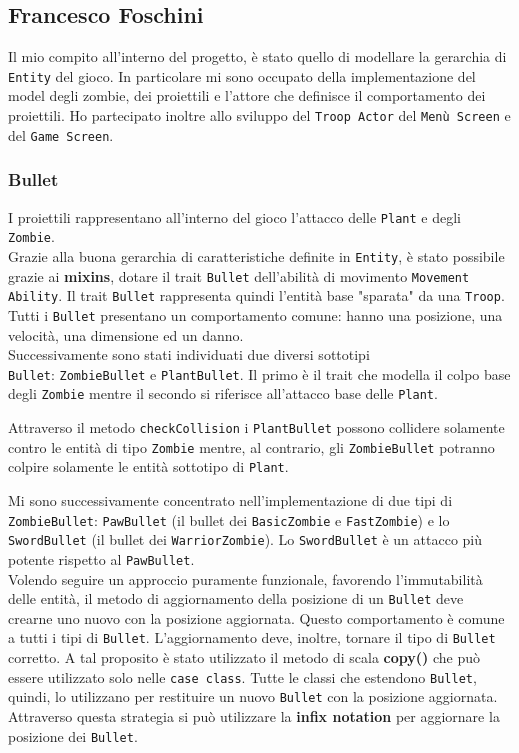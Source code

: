 \subsection{Francesco Foschini}
Il mio compito all'interno del progetto, è stato quello di modellare la gerarchia di \texttt{Entity} del gioco.
In particolare mi sono occupato della implementazione del model degli zombie, dei proiettili e l'attore che definisce il comportamento dei proiettili.
Ho partecipato inoltre allo sviluppo del \texttt{Troop Actor} del \texttt{Menù Screen} e del \texttt{Game Screen}.

\subsubsection{Bullet}
I proiettili rappresentano all'interno del gioco l'attacco delle \texttt{Plant} e degli \texttt{Zombie}.\\

Grazie alla buona gerarchia di caratteristiche definite in \texttt{Entity}, è stato possibile grazie  ai \textbf{mixins},
dotare il trait \texttt{Bullet} dell'abilità di movimento \texttt{Movement Ability}.
Il trait \texttt{Bullet} rappresenta quindi l'entità base "sparata" da una \texttt{Troop}.
Tutti i \texttt{Bullet} presentano un comportamento comune: hanno una posizione, una velocità, una dimensione ed un danno.\\


Successivamente sono stati individuati due diversi sottotipi\\ \texttt{Bullet}: \texttt{ZombieBullet} e \texttt{PlantBullet}.
Il primo è il trait che modella il colpo base degli \texttt{Zombie} mentre il secondo si riferisce all'attacco base delle \texttt{Plant}.

Attraverso il metodo \texttt{checkCollision} i \texttt{PlantBullet} possono collidere solamente contro le entità di tipo \texttt{Zombie} mentre,
al contrario, gli \texttt{ZombieBullet} potranno colpire solamente le entità sottotipo di \texttt{Plant}.

Mi sono successivamente concentrato nell'implementazione di due tipi di \texttt{ZombieBullet}: \texttt{PawBullet} (il bullet dei
\texttt{BasicZombie} e \texttt{FastZombie}) e lo \\
\texttt{SwordBullet} (il bullet dei \texttt{WarriorZombie}).
Lo \texttt{SwordBullet} è un attacco più potente rispetto al \texttt{PawBullet}.\\

Volendo seguire un approccio puramente funzionale, favorendo l'immutabilità delle entità, il metodo di
aggiornamento della posizione di un \texttt{Bullet} deve crearne uno nuovo con la posizione aggiornata.
Questo comportamento è comune a tutti i tipi di \texttt{Bullet}. L'aggiornamento deve, inoltre,
tornare il tipo di \texttt{Bullet} corretto. A tal proposito è stato utilizzato il metodo di scala  \textbf{copy()} che può essere utilizzato solo nelle \texttt{case class}. Tutte le classi che estendono
\texttt{Bullet}, quindi, lo utilizzano per restituire un nuovo \texttt{Bullet} con la posizione aggiornata.
Attraverso questa strategia si può utilizzare la \textbf{infix notation} per aggiornare la posizione dei \texttt{Bullet}.

